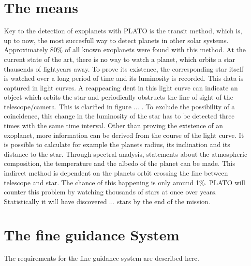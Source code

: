 \section{The means}
Key to the detection of exoplanets with PLATO is the transit method, which is, up to now, the most succesfull way to detect planets in other solar systems. Approximately 80\% of all known exoplanets were found with this method.
\newline
At the current state of the art, there is no way to watch a planet, which orbits a star thausends of lightyears away. To prove its existence, the corresponding star itself is watched over a long period of time and its luminosity is recorded. This data is captured in light curves. A reappearing dent in this light curve can indicate an object which orbits the star and periodically obstructs the line of sight of the telescope/camera. This is clarified in figure ... . To exclude the possibility of a coincidence, this change in the luminosity of the star has to be detected three times with the same time interval. Other than proving the existence of an exoplanet, more information can be derived from the course of the light curve. It is possible to calculate for example the planets radius, its inclination and its distance to the star. Through spectral analysis, statements about the atmospheric composition, the temperature and the albedo of the planet can be made.           
\newline 
This indirect method is dependent on the planets orbit crossing the line between telescope and star. The chance of this happening is only around 1\%. PLATO will counter this problem by watching thousands of stars at once over years. Statistically it will have discovered ... stars by the end of the mission.  
 
\section{The fine guidance System}
The requirements for the fine guidance system are described here.